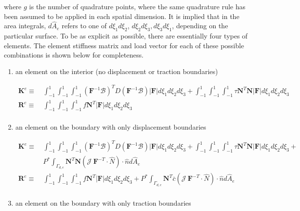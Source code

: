 \documentclass[10pt]{article}
\begin{document}
where \(g\) is the number of quadrature points, where the same quadrature rule has been assumed to be applied in each spatial dimension. It is implied that in the area integrals, \(d\hat{A}_e\) refers to one of \(d\xi_1d\xi_2\), \(d\xi_2d\xi_3, d\xi_3d\xi_1\), depending on the particular surface. To be as explicit as possible, there are essentially four types of elements. The element stiffness matrix and load vector for each of these possible combinations is shown below for completeness.

\begin{enumerate}
\item an element on the interior (no displacement or traction boundaries)

\begin{equation}
\begin{aligned}
\textbf{K}^e\equiv&\ \int_{-1}^{1}\int_{-1}^{1}\int_{-1}^{1}(\textbf{F}^{-1}\mathscr{B})^TD(\textbf{F}^{-1}\mathscr{B}) |\textbf{F}|d\xi_1d\xi_2d\xi_3+\int_{-1}^{1}\int_{-1}^{1}\int_{-1}^{1}\tau \textbf{N}^T\textbf{N} |\textbf{F}|d\xi_1d\xi_2d\xi_3\\
\textbf{R}^e\equiv&\ \int_{-1}^{1}\int_{-1}^{1}\int_{-1}^{1}f\textbf{N}^T|\textbf{F}|d\xi_1d\xi_2d\xi_3\\
\end{aligned}
\end{equation}

\item an element on the boundary with only displacement boundaries

\begin{equation}
\begin{aligned}
\textbf{K}^e\equiv&\ \int_{-1}^{1}\int_{-1}^{1}\int_{-1}^{1}(\textbf{F}^{-1}\mathscr{B})^TD(\textbf{F}^{-1}\mathscr{B}) |\textbf{F}|d\xi_1d\xi_2d\xi_3+\int_{-1}^{1}\int_{-1}^{1}\int_{-1}^{1}\tau \textbf{N}^T\textbf{N} |\textbf{F}|d\xi_1d\xi_2d\xi_3+\quad\\
&\ P^{*}\int_{\Gamma_{d,e}}\textbf{N}^T\textbf{N} (\mathscr{J}\ \textbf{F}^{-T}\cdot\hat{N})\cdot\hat{n}d\hat{A}_e\\
\textbf{R}^e\equiv&\ \int_{-1}^{1}\int_{-1}^{1}\int_{-1}^{1}f\textbf{N}^T|\textbf{F}|d\xi_1d\xi_2d\xi_3+P^{*}\int_{\Gamma_{d,e}}\textbf{N}^T\bar{c}(\mathscr{J}\ \textbf{F}^{-T}\cdot\hat{N})\cdot\hat{n}d\hat{A}_e\\
\end{aligned}
\end{equation}

\item an element on the boundary with only traction boundaries


\end{enumerate}
\end{document}

